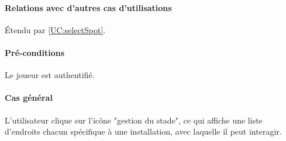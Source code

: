 \paragraph{Relations avec d'autres cas d'utilisations}
Étendu par \ref{UC:selectSpot}.
\paragraph{Pré-conditions}
\begin{list}{}{\leftmargin=1.5em}
\item{Le joueur est authentifié.}
\end{list}
\paragraph{Cas général}
L'utilisateur clique sur l'icône "gestion du stade", ce qui affiche une liste d'endroits chacun spécifique à une installation, avec laquelle il peut interagir. 
